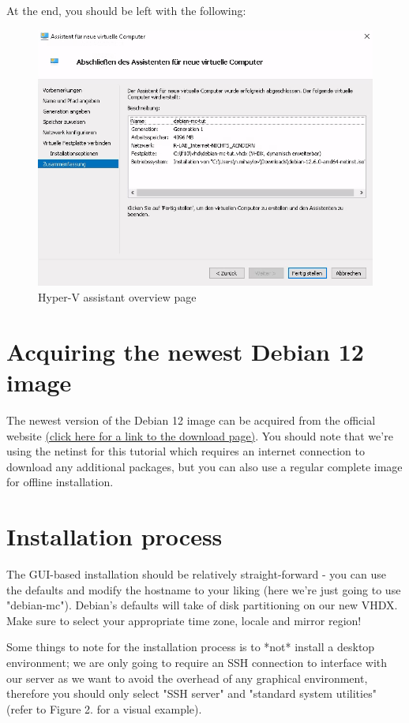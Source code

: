 \documentclass[]{article}
\begin{document}
At the end, you should be left with the following:

\begin{figure}[h]
	\caption{Hyper-V assistant overview page}
	\centering
	\includegraphics[width=1\textwidth]{vm-config}
\end{figure}
\FloatBarrier

\section{Acquiring the newest Debian 12 image}

The newest version of the Debian 12 image can be acquired from the official website \href{https://www.debian.org/download}{(click here for a link to the download page)}. You should note that we're using the netinst for this tutorial which requires an internet connection to download any additional packages, but you can also use a regular complete image for offline installation.

\section{Installation process}

The GUI-based installation should be relatively straight-forward - you can use the defaults and modify the hostname to your liking (here we're just going to use "debian-mc"). Debian's defaults will take of disk partitioning on our new VHDX. Make sure to select your appropriate time zone, locale and mirror region!

Some things to note for the installation process is to *not* install a desktop environment; we are only going to require an SSH connection to interface with our server as we want to avoid the overhead of any graphical environment, therefore you should only select "SSH server" and "standard system utilities" (refer to Figure 2. for a visual example).
\end{document}

